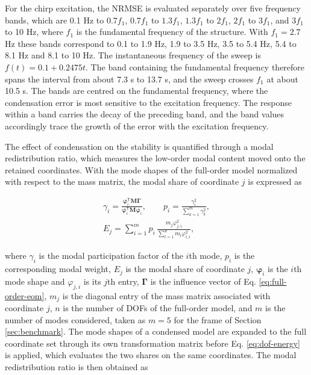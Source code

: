 \documentclass[a4paper,fleqn,review,12pt]{cas-sc}
\numberwithin{equation}{section}
\begin{document}
For the chirp excitation, the NRMSE is evaluated separately over five frequency bands, which are 0.1 Hz to \(0.7f_{1}\), \(0.7f_{1}\) to \(1.3f_{1}\), \(1.3f_{1}\) to \(2f_{1}\), \(2f_{1}\) to \(3f_{1}\), and \(3f_{1}\) to 10 Hz, where \(f_{1}\) is the fundamental frequency of the structure. With \(f_{1}=2.7\) Hz these bands correspond to 0.1 to 1.9 Hz, 1.9 to 3.5 Hz, 3.5 to 5.4 Hz, 5.4 to 8.1 Hz and 8.1 to 10 Hz. The instantaneous frequency of the sweep is \(f(t)=0.1+0.2475t\). The band containing the fundamental frequency therefore spans the interval from about 7.3 s to 13.7 s, and the sweep crosses \(f_{1}\) at about 10.5 s. The bands are centred on the fundamental frequency, where the condensation error is most sensitive to the excitation frequency. The response within a band carries the decay of the preceding band, and the band values accordingly trace the growth of the error with the excitation frequency.

The effect of condensation on the stability is quantified through a modal redistribution ratio, which measures the low-order modal content moved onto the retained coordinates. With the mode shapes of the full-order model normalized with respect to the mass matrix, the modal share of coordinate \(j\) is expressed as

\vspace{-3.5em}
\begin{equation}
	\begin{gathered}
		\gamma_{i}=
		\frac{\bm{\varphi}_{i}^{\mathsf{T}}\mathbf{M}\bm{\Gamma}}
		{\bm{\varphi}_{i}^{\mathsf{T}}\mathbf{M}\bm{\varphi}_{i}},
		\qquad
		p_{i}=\frac{\gamma_{i}^{2}}{\displaystyle\sum_{k=1}^{m}\gamma_{k}^{2}},\\[2pt]
		E_{j}=\sum_{i=1}^{m}p_{i}\,
		\frac{m_{j}\varphi_{j,i}^{2}}{\displaystyle\sum_{l=1}^{n}m_{l}\varphi_{l,i}^{2}},
	\end{gathered}
	\label{eq:dof-energy}
\end{equation}
\vspace{-3.5em}

\noindent where \(\gamma_{i}\) is the modal participation factor of the \(i\)th mode, \(p_{i}\) is the corresponding modal weight, \(E_{j}\) is the modal share of coordinate \(j\), \(\bm{\varphi}_{i}\) is the \(i\)th mode shape and \(\varphi_{j,i}\) is its \(j\)th entry, \(\bm{\Gamma}\) is the influence vector of Eq. \eqref{eq:full-order-eom}, \(m_{j}\) is the diagonal entry of the mass matrix associated with coordinate \(j\), \(n\) is the number of DOFs of the full-order model, and \(m\) is the number of modes considered, taken as \(m=5\) for the frame of Section \ref{sec:benchmark}. The mode shapes of a condensed model are expanded to the full coordinate set through its own transformation matrix before Eq. \eqref{eq:dof-energy} is applied, which evaluates the two shares on the same coordinates. The modal redistribution ratio is then obtained as
\end{document}
